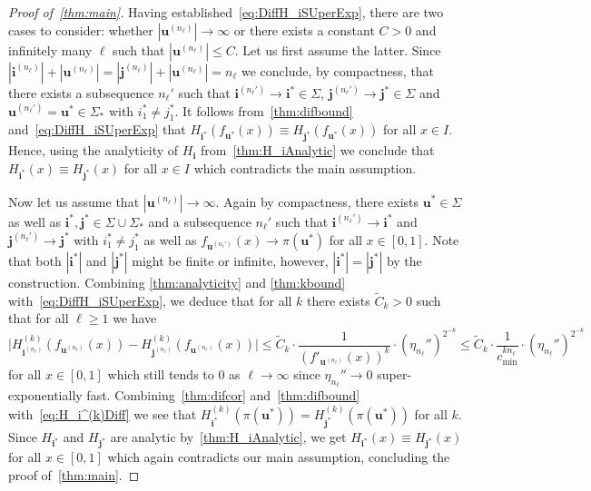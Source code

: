 \documentclass[11pt,]{article}
\def\cref#1{\ref{#1}}%
\theoremstyle{definition}
\theoremstyle{remark}
\newcommand{\0}{\mathbf{0}}
\newcommand{\bi}{\mathbf{i}}
\newcommand{\bj}{\mathbf{j}}
\newcommand{\bu}{\mathbf{u}}
\numberwithin{equation}{section}
\begin{document}
\begin{proof}[Proof of~\cref{thm:main}]
Having established~\cref{eq:DiffH_iSUperExp}, there are two cases to consider: whether
$|\bu^{(n_\ell)}| \to \infty$ or there exists a constant $C>0$ and infinitely many $\ell$ such that
$|\bu^{(n_\ell)}| \leq C$. Let us first assume the latter. Since $|\bi^{(n_\ell)}|+ |\bu^{(n_\ell)}|
= |\bj^{(n_\ell)}|+|\bu^{(n_\ell)}| = n_\ell$ we conclude, by compactness, that
there exists a subsequence $n_\ell'$ such that $\bi^{(n_\ell')} \to \bi^*\in\Sigma$,
$\bj^{(n_\ell')}\to\bj^*\in\Sigma$ and $\bu^{(n_\ell')}=\bu^*\in\Sigma_*$ with $i_1^*\neq j_1^*$.
It follows from~\cref{thm:difbound} and~\cref{eq:DiffH_iSUperExp} that
$
  H_{\bi^*}(f_{\bu^*}(x))\equiv H_{\bj^*}(f_{\bu^*}(x))
$
for all $x\in I$.  Hence, using the analyticity of $H_{\bi}$ from~\cref{thm:H_iAnalytic} we conclude
that $H_{\bi^*}(x) \equiv H_{\bj^*}(x)$ for all $x\in I$ which contradicts the main assumption.

Now let us assume that $|\bu^{(n_\ell)}| \to \infty$. Again by compactness, there exists
$\bu^*\in\Sigma$ as well as $\bi^*,\bj^*\in\Sigma\cup\Sigma_*$  and a
subsequence $n_\ell'$ such that $\bi^{(n_\ell')}\to \bi^*$ and $\bj^{(n_\ell')}\to \bj^*$ with
$i_1^*\neq j_1^*$ as well as $f_{\bu^{(n_\ell')}}(x) \to \pi(\bu^*)$ for all $x\in[0,1]$. Note that
both $|\bi^*|$ and
$|\bj^*|$ might be finite or infinite, however, $|\bi^*|=|\bj^*|$ by the construction. Combining
\cref{thm:analyticity} and \cref{thm:kbound} with~\cref{eq:DiffH_iSUperExp}, we deduce that for all
$k$ there
exists $\widetilde{C}_k>0$ such that for all $\ell\geq 1$ we have
\begin{equation}\label{eq:H_i^(k)Diff}
  \big|H_{\bi^{(n_\ell)}}^{(k)}(f_{\bu^{(n_\ell)}}(x)) - H_{\bj^{(n_\ell)}}^{(k)}(f_{\bu^{(n_\ell)}}(x))\big|
  \leq \widetilde{C}_k \cdot
  \frac{1}{(f'_{\bu^{(n_\ell)}}(x))^k}\cdot\left(\eta_{n_\ell}''\right)^{2^{-k}}\leq\widetilde{C}_k
  \cdot \frac{1}{c_{\min}^{k n_\ell}}\cdot\left(\eta_{n_\ell}''\right)^{2^{-k}}
\end{equation}
for all $x\in[0,1]$ which still tends to $0$ as $\ell\to\infty$ since $\eta_{n_{\ell}}''\to 0$
super-exponentially fast. Combining~\cref{thm:difcor} and~\cref{thm:difbound}
with~\cref{eq:H_i^(k)Diff} we see that $H_{\bi^*}^{(k)}(\pi(\bu^*))=H_{\bj^*}^{(k)}(\pi(\bu^*))$ for
all $k$.
Since $H_{\bi^*}$ and $H_{\bj^*}$ are analytic by~\cref{thm:H_iAnalytic}, we get 
$H_{\bi^*}(x)\equiv H_{\bj^*}(x)$ for all
$x\in[0,1]$ which again contradicts our main assumption, concluding the proof of~\cref{thm:main}. 
\end{proof}
\end{document}
